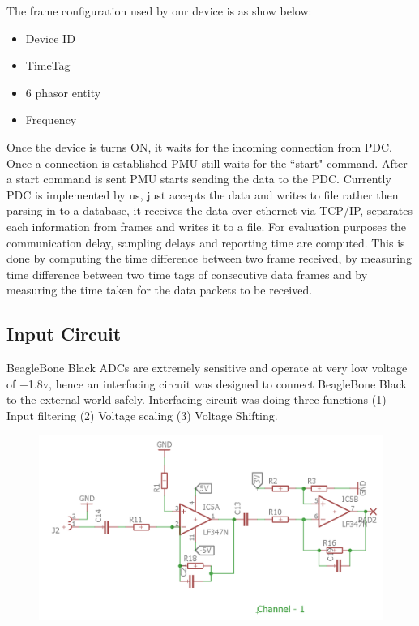 The frame configuration used by our device is as show below:
\begin{itemize}
	\item Device ID
	\item TimeTag 
	\item 6 phasor entity 
	\item Frequency
\end{itemize}

Once the device is turns ON, it waits for the incoming connection from PDC. Once a connection is established PMU still waits for the ``start" command. After a start command is sent PMU starts sending the data to the PDC. Currently PDC is implemented by us, just accepts the data and writes to file rather then parsing in to a database, it receives the data over ethernet via TCP/IP, separates each information from frames and writes it to a file. For evaluation purposes the communication delay, sampling delays and reporting time are computed. This is done by computing the time difference between two frame received, by measuring time difference between two time tags of consecutive data frames and by measuring the time taken for the data packets to be received. 

\subsection{Input Circuit}
BeagleBone Black ADCs are extremely sensitive and operate at very low voltage of +1.8v, hence an interfacing circuit was designed to connect BeagleBone Black to the external world safely. Interfacing circuit was doing three functions (1) Input filtering (2) Voltage scaling (3) Voltage Shifting.

\begin{figure}[h]
	\centering
	\includegraphics[width=\textwidth]{fig/input_circuit.png}
\end{figure}

